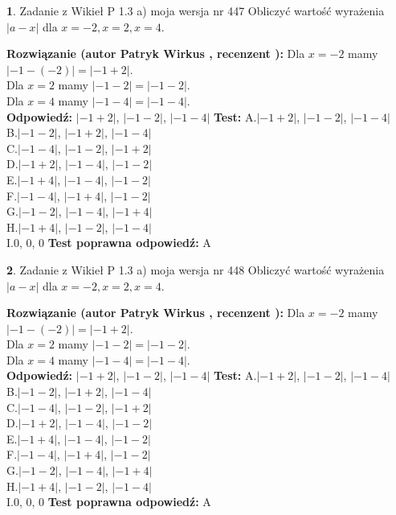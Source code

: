 \documentclass[12pt, a4paper]{article}
\theoremstyle{definition} %
\newtheorem{zad}{}
\newcommand{\zadStart}[1]{\begin{zad}#1\newline}
\newcommand{\zadStop}{\end{zad}}
\newcommand{\rozwStart}[2]{\noindent \textbf{Rozwiązanie (autor #1 , recenzent #2): }\newline}
\newcommand{\rozwStop}{\newline}
\newcommand{\odpStart}{\noindent \textbf{Odpowiedź:}\newline}
\newcommand{\odpStop}{\newline}
\newcommand{\testStart}{\noindent \textbf{Test:}\newline}
\newcommand{\testStop}{\newline}
\newcommand{\kluczStart}{\noindent \textbf{Test poprawna odpowiedź:}\newline}
\newcommand{\kluczStop}{\newline}
\begin{document}
\zadStart{Zadanie z Wikieł P 1.3 a) moja wersja nr 447}
Obliczyć wartość wyrażenia $|a - x|$ dla $x=-2,x=2,x=4$.
\zadStop
\rozwStart{Patryk Wirkus}{}
Dla $x = -2$ mamy $|-1 - (-2)| = |-1 + 2|$.\\
Dla $x = 2$ mamy $|-1 - 2| = |-1 - 2|$.\\
Dla $x = 4$ mamy $|-1 - 4| = |-1 - 4|$.\\
\rozwStop
\odpStart
$|-1 + 2|$, $|-1 - 2|$, $|-1 - 4|$
\odpStop
\testStart
A.$|-1 + 2|$, $|-1 - 2|$, $|-1 - 4|$\\
B.$|-1 - 2|$, $|-1 + 2|$, $|-1 - 4|$\\
C.$|-1 - 4|$, $|-1 - 2|$, $|-1 + 2|$\\
D.$|-1 + 2|$, $|-1 - 4|$, $|-1 - 2|$\\
E.$|-1 + 4|$, $|-1 - 4|$, $|-1 - 2|$\\
F.$|-1 - 4|$, $|-1 + 4|$, $|-1 - 2|$\\
G.$|-1 - 2|$, $|-1 - 4|$, $|-1 + 4|$\\
H.$|-1 + 4|$, $|-1 - 2|$, $|-1 - 4|$\\
I.$0$, $0$, $0$
\testStop
\kluczStart
A
\kluczStop



\zadStart{Zadanie z Wikieł P 1.3 a) moja wersja nr 448}
Obliczyć wartość wyrażenia $|a - x|$ dla $x=-2,x=2,x=4$.
\zadStop
\rozwStart{Patryk Wirkus}{}
Dla $x = -2$ mamy $|-1 - (-2)| = |-1 + 2|$.\\
Dla $x = 2$ mamy $|-1 - 2| = |-1 - 2|$.\\
Dla $x = 4$ mamy $|-1 - 4| = |-1 - 4|$.\\
\rozwStop
\odpStart
$|-1 + 2|$, $|-1 - 2|$, $|-1 - 4|$
\odpStop
\testStart
A.$|-1 + 2|$, $|-1 - 2|$, $|-1 - 4|$\\
B.$|-1 - 2|$, $|-1 + 2|$, $|-1 - 4|$\\
C.$|-1 - 4|$, $|-1 - 2|$, $|-1 + 2|$\\
D.$|-1 + 2|$, $|-1 - 4|$, $|-1 - 2|$\\
E.$|-1 + 4|$, $|-1 - 4|$, $|-1 - 2|$\\
F.$|-1 - 4|$, $|-1 + 4|$, $|-1 - 2|$\\
G.$|-1 - 2|$, $|-1 - 4|$, $|-1 + 4|$\\
H.$|-1 + 4|$, $|-1 - 2|$, $|-1 - 4|$\\
I.$0$, $0$, $0$
\testStop
\kluczStart
A
\kluczStop
\end{document}
